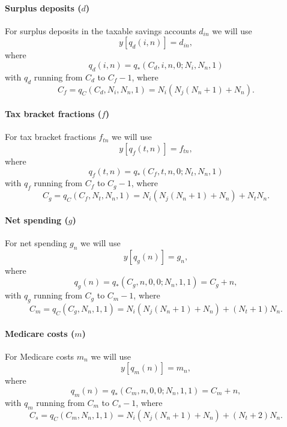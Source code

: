 \documentclass{report}[fleqn,11pt]
\begin{document}
\paragraph*{Surplus deposits (\boldmath$d$)}
For surplus deposits in the taxable savings accounts $d_{in}$ we will use
\begin{equation}
	y[q_d(i, n)] = d_{in},
\end{equation}
where
\begin{equation}
	q_d(i, n) = q_*(C_d, i, n, 0; N_i, N_n, 1)
\end{equation}
with $q_d$ running from $C_d$ to $C_f - 1$, where
\[
	C_f = q_C(C_d, N_i, N_n, 1) = N_i(N_j(N_n+1) + N_n).
\]

\paragraph*{Tax bracket fractions (\boldmath$f$)}
For tax bracket fractions $f_{t n}$ we will use
\begin{equation}
	y[q_f(t, n)] = f_{t n},
\end{equation}
where
\begin{equation}
	q_f(t, n) = q_*(C_f, t, n, 0; N_t, N_n, 1)
\end{equation}
with $q_f$ running from $C_f$ to $C_g - 1$, where
\[
	C_g = q_C(C_f, N_t, N_n, 1) = N_i(N_j(N_n+1) + N_n) + N_tN_n.
\]

\paragraph*{Net spending (\boldmath$g$)}
For net spending $g_{n}$ we will use
\begin{equation}
	y[q_g(n)] = g_{n},
\end{equation}
where
\begin{equation}
	q_g(n) = q_*(C_g, n, 0, 0; N_n, 1, 1) = C_g + n,
\end{equation}
with $q_g$ running from $C_g$ to $C_m - 1$, where
\[
	C_m = q_C(C_g, N_n, 1, 1) = N_i(N_j(N_n+1) + N_n) + (N_t + 1) N_n.
\]

\paragraph*{Medicare costs (\boldmath$m$)}
For Medicare costs $m_{n}$ we will use
\begin{equation}
	y[q_m(n)] = m_{n},
\end{equation}
where
\begin{equation}
	q_m(n) = q_*(C_m, n, 0, 0; N_n, 1, 1) = C_m + n,
\end{equation}
with $q_m$ running from $C_m$ to $C_s - 1$, where
\[
	C_s = q_C(C_m, N_n, 1, 1) = N_i(N_j(N_n+1) + N_n) + (N_t + 2) N_n.
\]
\end{document}
